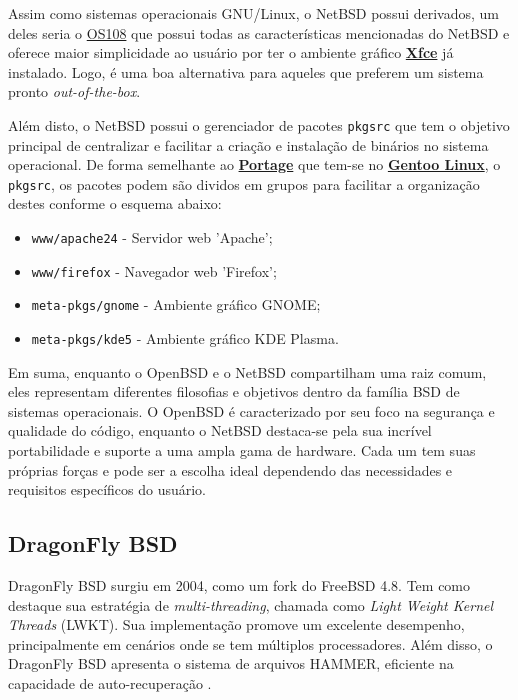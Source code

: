 \documentclass[a4paper,10pt]{article}
\begin{document}
Assim como sistemas operacionais GNU/Linux, o NetBSD possui derivados, um deles seria o \href{https://github.com/OS108/OS108}{OS108} que possui todas as características mencionadas do NetBSD e oferece maior simplicidade ao usuário por ter o ambiente gráfico \href{https://xfce.org/}{\textbf{Xfce}} já instalado. Logo, é uma boa alternativa para aqueles que preferem um sistema pronto \textit{out-of-the-box}.

Além disto, o NetBSD possui o gerenciador de pacotes \verb|pkgsrc| que tem o objetivo principal de centralizar e facilitar a criação e instalação de binários no sistema operacional. De forma semelhante ao \href{https://wiki.gentoo.org/wiki/Portage}{\textbf{Portage}} que tem-se no \href{https://www.gentoo.org/}{\textbf{Gentoo Linux}}, o \verb|pkgsrc|, os pacotes podem são dividos em grupos para facilitar a organização destes conforme o esquema abaixo:

\begin{itemize}
    \item \verb|www/apache24| - Servidor web 'Apache';
    \item \verb|www/firefox| - Navegador web 'Firefox';
    \item \verb|meta-pkgs/gnome| - Ambiente gráfico GNOME;
    \item \verb|meta-pkgs/kde5| - Ambiente gráfico KDE Plasma.
\end{itemize}

Em suma, enquanto o OpenBSD e o NetBSD compartilham uma raiz comum, eles representam diferentes filosofias e objetivos dentro da família BSD de sistemas operacionais. O OpenBSD é caracterizado por seu foco na segurança e qualidade do código, enquanto o NetBSD destaca-se pela sua incrível portabilidade e suporte a uma ampla gama de hardware. Cada um tem suas próprias forças e pode ser a escolha ideal dependendo das necessidades e requisitos específicos do usuário.

\subsection{DragonFly BSD}

DragonFly BSD surgiu em 2004, como um fork do FreeBSD 4.8. Tem como destaque sua estratégia de \textit{multi-threading}, chamada como \textit{Light Weight Kernel Threads} (LWKT). Sua implementação promove um excelente desempenho, principalmente em cenários onde se tem múltiplos processadores. Além disso, o DragonFly BSD apresenta o sistema de arquivos HAMMER, eficiente na capacidade de auto-recuperação \cite{hsu2004dragonflybsd}.
\end{document}
